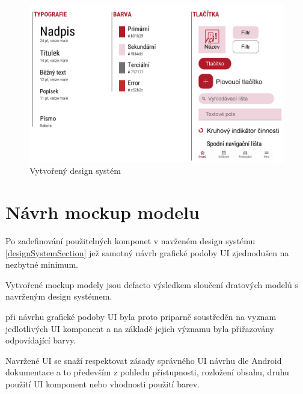 \begin{figure}[H]
  \centering
  \includegraphics[width=.99\textwidth]{design_system.jpg}
  \caption{Vytvořený design systém}
  \label{fig:design_system}
\end{figure}

\section{Návrh mockup modelu} \label{navrhMockupModelu}
Po zadefinování použitelných komponet v navženém design systému \ref{designSystemSection} jež samotný návrh grafické podoby UI zjednodušen 
na nezbytné minimum. 

Vytvořené mockup modely jsou defacto výsledkem sloučení dratových modelů s navrženým design systémem.

při návrhu grafické podoby UI byla proto priparně soustředěn na vyznam jedlotlivých UI komponent a na základě jejich významu byla
přiřazovány odpovídající barvy. 

Navržené UI se snaží respektovat zásady správného UI návrhu dle Android dokumentace a to především z pohledu přístupnosti, rozložení obsahu, 
druhu použití UI komponent nebo vhodnosti použití barev.

